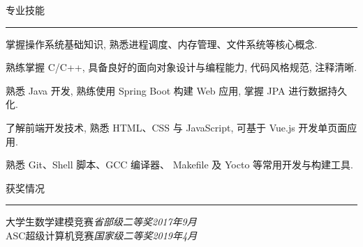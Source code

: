\documentclass{cv} %
\renewenvironment{rSection}[1]{
\sectionskip
\textcolor{RoyalPurple}{\MakeUppercase{#1}}
\sectionlineskip
\hrule
\begin{list}{}{
\setlength{\leftmargin}{1.5em}
}
\item[]
}{
\end{list}
}
\begin{document}
\begin{rSection}{专业技能}
  \begin{rSubsection}{}{}{}{}
    \item 掌握操作系统基础知识, 熟悉进程调度、内存管理、文件系统等核心概念.
    \item 熟练掌握 C/C++, 具备良好的面向对象设计与编程能力, 代码风格规范, 注释清晰.
    \item 熟悉 Java 开发, 熟练使用 Spring Boot 构建 Web 应用, 掌握 JPA 进行数据持久化.
    \item 了解前端开发技术, 熟悉 HTML、CSS 与 JavaScript, 可基于 Vue.js 开发单页面应用.
    \item 熟悉 Git、Shell 脚本、GCC 编译器、 Makefile 及 Yocto 等常用开发与构建工具.
  \end{rSubsection}
\end{rSection}


\begin{rSection}{获奖情况} \itemsep -2pt
  {大学生数学建模竞赛}\hfill {\it 省部级二等奖}\hfill {\em 2017年9月} \\
  {ASC超级计算机竞赛}\hfill {\it 国家级二等奖}\hfill {\em 2019年4月}
\end{rSection}
\end{document}
